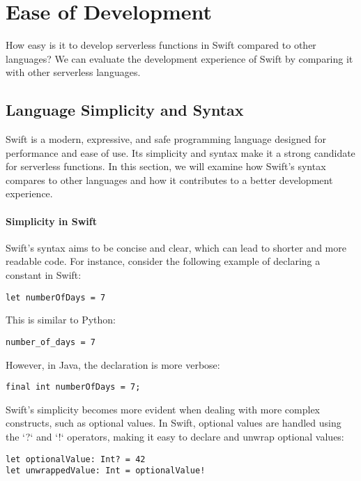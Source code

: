 \chapter{Ease of Development}
\etocsettocstyle{\rule{\textwidth}{1pt}}{\rule{\textwidth}{1pt}} %
\localtableofcontents

How easy is it to develop serverless functions in Swift compared to other languages? We can evaluate the development experience of Swift by comparing it with other serverless languages.


\section{Language Simplicity and Syntax}
Swift is a modern, expressive, and safe programming language designed for performance and ease of use. Its simplicity and syntax make it a strong candidate for serverless functions. In this section, we will examine how Swift's syntax compares to other languages and how it contributes to a better development experience.

\subsubsection{Simplicity in Swift}
Swift's syntax aims to be concise and clear, which can lead to shorter and more readable code. For instance, consider the following example of declaring a constant in Swift:

\begin{verbatim}
let numberOfDays = 7
\end{verbatim}

This is similar to Python:

\begin{verbatim}
number_of_days = 7
\end{verbatim}

However, in Java, the declaration is more verbose:

\begin{verbatim}
final int numberOfDays = 7;
\end{verbatim}

Swift's simplicity becomes more evident when dealing with more complex constructs, such as optional values. In Swift, optional values are handled using the `?` and `!` operators, making it easy to declare and unwrap optional values:

\begin{verbatim}
let optionalValue: Int? = 42
let unwrappedValue: Int = optionalValue!
\end{verbatim}

